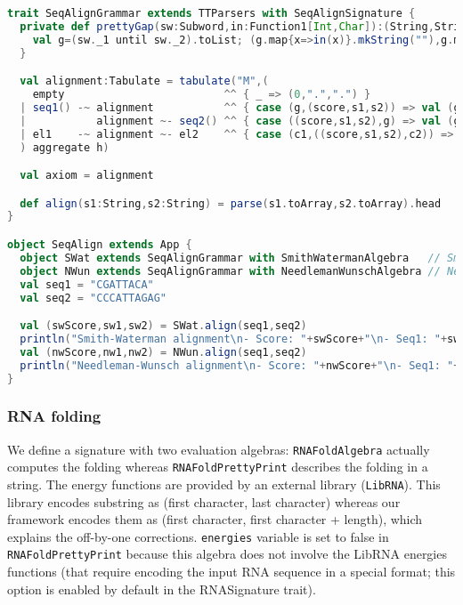 \begin{lstlisting}[language=Scala,captionpos=none]
trait SeqAlignGrammar extends TTParsers with SeqAlignSignature {
  private def prettyGap(sw:Subword,in:Function1[Int,Char]):(String,String) = {
    val g=(sw._1 until sw._2).toList; (g.map{x=>in(x)}.mkString(""),g.map{x=>"-"}.mkString(""))
  }

  val alignment:Tabulate = tabulate("M",(
    empty                         ^^ { _ => (0,".",".") }
  | seq1() -~ alignment           ^^ { case (g,(score,s1,s2)) => val (g1,g2)=prettyGap(g,in1); (gap(score,g),s1+g1,s2+g2) }
  |           alignment ~- seq2() ^^ { case ((score,s1,s2),g) => val (g1,g2)=prettyGap(g,in2); (gap(score,g),s1+g2,s2+g1) }
  | el1    -~ alignment ~- el2    ^^ { case (c1,((score,s1,s2),c2)) => (score+pair(c1,c2),s1+c1, s2+c2) }
  ) aggregate h)

  val axiom = alignment

  def align(s1:String,s2:String) = parse(s1.toArray,s2.toArray).head
}

object SeqAlign extends App {
  object SWat extends SeqAlignGrammar with SmithWatermanAlgebra   // Smith-Waterman
  object NWun extends SeqAlignGrammar with NeedlemanWunschAlgebra // Needleman-Wunsch
  val seq1 = "CGATTACA"
  val seq2 = "CCCATTAGAG"

  val (swScore,sw1,sw2) = SWat.align(seq1,seq2)
  println("Smith-Waterman alignment\n- Score: "+swScore+"\n- Seq1: "+sw1+"\n- Seq2: "+sw2+"\n")
  val (nwScore,nw1,nw2) = NWun.align(seq1,seq2)
  println("Needleman-Wunsch alignment\n- Score: "+nwScore+"\n- Seq1: "+nw1+"\n- Seq2: "+nw2+"\n")
}
\end{lstlisting}

\newpage
\subsubsection{RNA folding} \label{ex_rnafold}
We define a signature with two evaluation algebras: {\tt RNAFoldAlgebra} actually computes the folding whereas {\tt RNAFoldPrettyPrint} describes the folding in a string. The energy functions are provided by an external library ({\tt LibRNA}). This library encodes substring as (first character, last character) whereas our framework encodes them as (first character, first character + length), which explains the off-by-one corrections. {\tt energies} variable is set to false in {\tt RNAFoldPrettyPrint} because this algebra does not involve the LibRNA energies functions (that require encoding the input RNA sequence in a special format; this option is enabled by default in the RNASignature trait).

